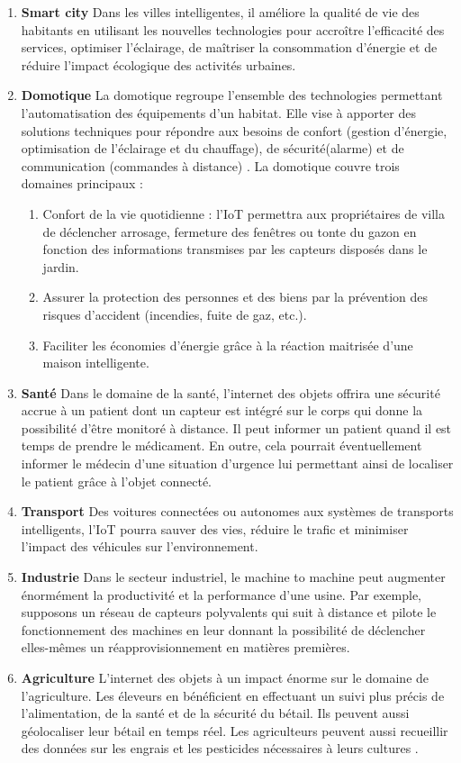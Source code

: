 \begin{enumerate}
	\item \textbf{Smart city}
	Dans les villes intelligentes, il améliore la qualité de vie des habitants en utilisant les nouvelles technologies pour accroître l’ef{\kern0pt}f{\kern0pt}icacité des services, optimiser l’éclairage, de maîtriser la consommation d’énergie et de réduire l’impact écologique des activités urbaines.
	\item \textbf{Domotique}
	La domotique regroupe l’ensemble des technologies permettant l’automatisation des équipements d’un habitat. Elle vise à apporter des solutions techniques pour répondre aux besoins de confort (gestion d’énergie, optimisation de l’éclairage et du chauf{\kern0pt}fage), de sécurité(alarme) et de communication (commandes à distance) \cite{locqueneux2015domotique}.
	La domotique couvre trois domaines principaux :
	\begin{enumerate}
		\item Confort de la vie quotidienne : l’IoT permettra aux propriétaires de villa de déclencher arrosage, fermeture des fenêtres ou tonte du gazon en fonction des informations transmises par les capteurs disposés dans le jardin.
		\item Assurer la protection des personnes et des biens par la prévention des risques d’accident (incendies, fuite de gaz, etc.).
		\item Faciliter les économies d’énergie grâce à la réaction maitrisée d’une maison intelligente.
	\end{enumerate}	
	\item \textbf{Santé}
	Dans le domaine de la santé, l’internet des objets of{\kern0pt}frira une sécurité accrue à un patient dont un capteur est intégré sur le corps qui donne la possibilité d’être monitoré à distance.
	Il peut informer un patient quand il est temps de prendre le médicament. En outre, cela pourrait éventuellement informer le médecin d’une situation d’urgence lui permettant ainsi de localiser le patient grâce à l’objet connecté.	
	\item \textbf{Transport}
	Des voitures connectées ou autonomes aux systèmes de transports intelligents, l’IoT pourra sauver des vies, réduire le traf{\kern0pt}ic et minimiser l’impact des véhicules sur l’environnement.
	
	\item \textbf{Industrie}
	Dans le secteur industriel, le machine to machine peut augmenter énormément la productivité et la performance d’une usine. Par exemple, supposons un réseau de capteurs polyvalents qui suit à distance et pilote le fonctionnement des machines en leur donnant la possibilité de déclencher elles-mêmes un réapprovisionnement en matières premières.	
	\item \textbf{Agriculture}
	L’internet des objets à un impact énorme sur le domaine de l’agriculture. Les éleveurs en bénéf{\kern0pt}icient en ef{\kern0pt}fectuant un suivi plus précis de l’alimentation, de la santé et de la sécurité du bétail. Ils peuvent aussi géolocaliser leur bétail en temps réel. Les agriculteurs peuvent aussi recueillir des données sur les engrais et les pesticides nécessaires à leurs cultures \cite{krigman2018agriculture}.
\end{enumerate}
\newpage
